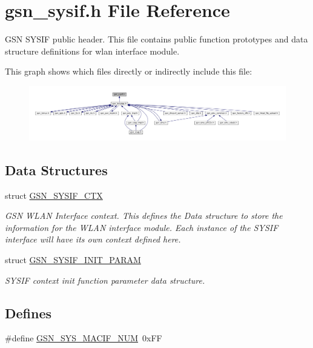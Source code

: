 \hypertarget{a00596}{
\section{gsn\_\-sysif.h File Reference}
\label{a00596}
}


GSN SYSIF public header. This file contains public function prototypes and data structure definitions for wlan interface module.  


This graph shows which files directly or indirectly include this file:
\nopagebreak
\begin{figure}[H]
\begin{center}
\leavevmode
\includegraphics[width=400pt]{a00842}
\end{center}
\end{figure}
\subsection*{Data Structures}
\begin{DoxyCompactItemize}
\item 
struct \hyperlink{a00261}{GSN\_\-SYSIF\_\-CTX}
\begin{DoxyCompactList}\small\item\em GSN WLAN Interface context. This defines the Data structure to store the information for the WLAN interface module. Each instance of the SYSIF interface will have its own context defined here. \end{DoxyCompactList}\item 
struct \hyperlink{a00262}{GSN\_\-SYSIF\_\-INIT\_\-PARAM}
\begin{DoxyCompactList}\small\item\em SYSIF context init function parameter data structure. \end{DoxyCompactList}\end{DoxyCompactItemize}
\subsection*{Defines}
\begin{DoxyCompactItemize}
\item 
\#define \hyperlink{a00596_a39f53f4c7ddc244f240d9386ec99b846}{GSN\_\-SYS\_\-MACIF\_\-NUM}~0xFF
\end{DoxyCompactItemize}
